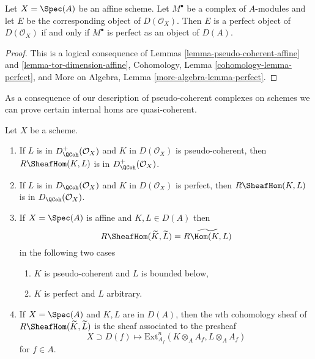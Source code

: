 \begin{lemma}
\label{lemma-perfect-affine}
Let $X = \Spec(A)$ be an affine scheme. Let $M^\bullet$ be a
complex of $A$-modules and let $E$ be the corresponding object
of $D(\mathcal{O}_X)$. Then $E$ is a perfect object of $D(\mathcal{O}_X)$
if and only if $M^\bullet$ is perfect as an object of $D(A)$.
\end{lemma}

\begin{proof}
This is a logical consequence of
Lemmas \ref{lemma-pseudo-coherent-affine} and
\ref{lemma-tor-dimension-affine},
Cohomology, Lemma \ref{cohomology-lemma-perfect}, and
More on Algebra, Lemma \ref{more-algebra-lemma-perfect}.
\end{proof}

\noindent
As a consequence of our description of pseudo-coherent
complexes on schemes we can prove certain internal homs
are quasi-coherent.

\begin{lemma}
\label{lemma-quasi-coherence-internal-hom}
Let $X$ be a scheme.
\begin{enumerate}
\item If $L$ is in $D^+_\QCoh(\mathcal{O}_X)$ and
$K$ in $D(\mathcal{O}_X)$ is pseudo-coherent, then
$R\SheafHom(K, L)$ is in $D_\QCoh^+(\mathcal{O}_X)$.
\item If $L$ is in $D_\QCoh(\mathcal{O}_X)$ and
$K$ in $D(\mathcal{O}_X)$ is perfect, then
$R\SheafHom(K, L)$ is in $D_\QCoh(\mathcal{O}_X)$.
\item If $X = \Spec(A)$ is affine and $K, L \in D(A)$ then
$$
R\SheafHom(\widetilde{K}, \widetilde{L}) = \widetilde{R\Hom(K, L)}
$$
in the following two cases
\begin{enumerate}
\item $K$ is pseudo-coherent and $L$ is bounded below,
\item $K$ is perfect and $L$ arbitrary.
\end{enumerate}
\item If $X = \Spec(A)$ and $K, L$ are in $D(A)$, then the $n$th
cohomology sheaf of $R\SheafHom(\widetilde{K}, \widetilde{L})$
is the sheaf associated to the presheaf
$$
X \supset D(f) \longmapsto \text{Ext}^n_{A_f}(K \otimes_A A_f, L \otimes_A A_f)
$$
for $f \in A$.
\end{enumerate}
\end{lemma}

